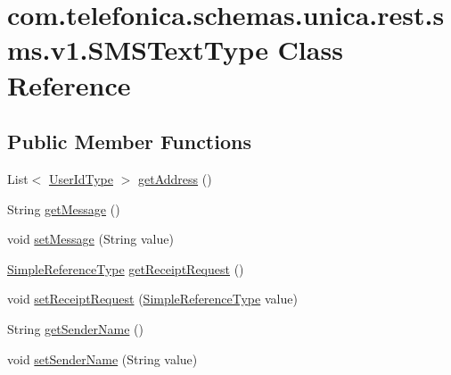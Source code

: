\hypertarget{classcom_1_1telefonica_1_1schemas_1_1unica_1_1rest_1_1sms_1_1v1_1_1SMSTextType}{
\section{com.telefonica.schemas.unica.rest.sms.v1.SMSTextType Class Reference}
\label{classcom_1_1telefonica_1_1schemas_1_1unica_1_1rest_1_1sms_1_1v1_1_1SMSTextType}
}
\subsection*{Public Member Functions}
\begin{DoxyCompactItemize}
\item 
List$<$ \hyperlink{classcom_1_1telefonica_1_1schemas_1_1unica_1_1rest_1_1common_1_1v1_1_1UserIdType}{UserIdType} $>$ \hyperlink{classcom_1_1telefonica_1_1schemas_1_1unica_1_1rest_1_1sms_1_1v1_1_1SMSTextType_a2148abe8bc84dd0f9da3995913b483b5}{getAddress} ()
\item 
String \hyperlink{classcom_1_1telefonica_1_1schemas_1_1unica_1_1rest_1_1sms_1_1v1_1_1SMSTextType_a8a75c91270823d1b07f23b91e0081cae}{getMessage} ()
\item 
void \hyperlink{classcom_1_1telefonica_1_1schemas_1_1unica_1_1rest_1_1sms_1_1v1_1_1SMSTextType_aec612d22dfacb39fb6ac3dd26630ee05}{setMessage} (String value)
\item 
\hyperlink{classcom_1_1telefonica_1_1schemas_1_1unica_1_1rest_1_1common_1_1v1_1_1SimpleReferenceType}{SimpleReferenceType} \hyperlink{classcom_1_1telefonica_1_1schemas_1_1unica_1_1rest_1_1sms_1_1v1_1_1SMSTextType_af4e95eabf27fd11df4103d3a8cb19f91}{getReceiptRequest} ()
\item 
void \hyperlink{classcom_1_1telefonica_1_1schemas_1_1unica_1_1rest_1_1sms_1_1v1_1_1SMSTextType_a339779bad201bdb946d40a0a912eaf22}{setReceiptRequest} (\hyperlink{classcom_1_1telefonica_1_1schemas_1_1unica_1_1rest_1_1common_1_1v1_1_1SimpleReferenceType}{SimpleReferenceType} value)
\item 
String \hyperlink{classcom_1_1telefonica_1_1schemas_1_1unica_1_1rest_1_1sms_1_1v1_1_1SMSTextType_a6e67447c9b74beeaf816dc484edeb1bf}{getSenderName} ()
\item 
void \hyperlink{classcom_1_1telefonica_1_1schemas_1_1unica_1_1rest_1_1sms_1_1v1_1_1SMSTextType_a7e011f47a5391cae54c53a860463124d}{setSenderName} (String value)
\item 

\end{DoxyCompactItemize}
